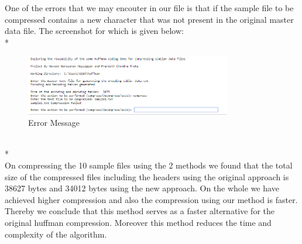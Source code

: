 {One of the errors that we may encouter in our file is that if the sample file to be compressed contains a new character that was not present in the original master data file. The screenshot for which is given below:
\\*
\begin{figure}[!h]
    \centering
    \includegraphics[width=90mm,scale=0.5]{Capture3.png}
    \caption{Error Message}
\end{figure}
\\*
\\On compressing the 10 sample files using the 2 methods we found that the total size of the compressed files including the headers using the original approach is 38627 bytes and 34012 bytes using the new approach. On the whole we have achieved higher compression and also the compression using our method is faster. Thereby we conclude that this method serves as a faster alternative for the original huffman compression. Moreover this method reduces the time and complexity of the algorithm.
}
